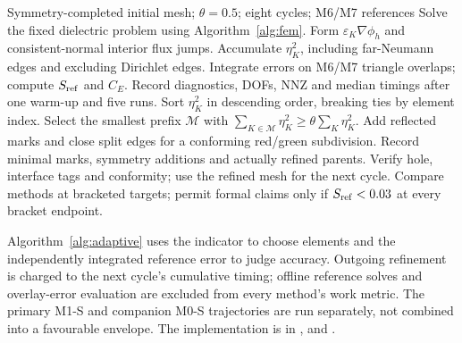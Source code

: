 \medskip
\begin{algorithm}[H]
\caption{Residual-based adaptive refinement}\label{alg:adaptive}
\begin{algorithmic}[1]
\Require Symmetry-completed initial mesh; $\theta=0.5$; eight cycles; M6/M7 references
\State Solve the fixed dielectric problem using Algorithm~\ref{alg:fem}.
\State Form $\varepsilon_K\nabla\phi_h$ and consistent-normal interior flux jumps.
\State Accumulate $\eta_K^2$, including far-Neumann edges and excluding Dirichlet edges.
\State Integrate errors on M6/M7 triangle overlaps; compute $S_{\rm ref}$ and $C_E$.
\State Record diagnostics, DOFs, NNZ and median timings after one warm-up and five runs.
\State Sort $\eta_K^2$ in descending order, breaking ties by element index.
\State Select the smallest prefix $\mathcal M$ with $\sum_{K\in\mathcal M}\eta_K^2\ge\theta\sum_K\eta_K^2$.
\State Add reflected marks and close split edges for a conforming red/green subdivision.
\State Record minimal marks, symmetry additions and actually refined parents.
\State Verify hole, interface tags and conformity; use the refined mesh for the next cycle.
\EndFor
\State Compare methods at bracketed targets; permit formal claims only if $S_{\rm ref}<0.03$ at every bracket endpoint.
\end{algorithmic}
\end{algorithm}
\medskip
Algorithm~\ref{alg:adaptive} uses the indicator to choose elements and the independently integrated reference error to judge accuracy. Outgoing refinement is charged to the next cycle's cumulative timing; offline reference solves and overlay-error evaluation are excluded from every method's work metric. The primary M1-S and companion M0-S trajectories are run separately, not combined into a favourable envelope. The implementation is in ,  and .

